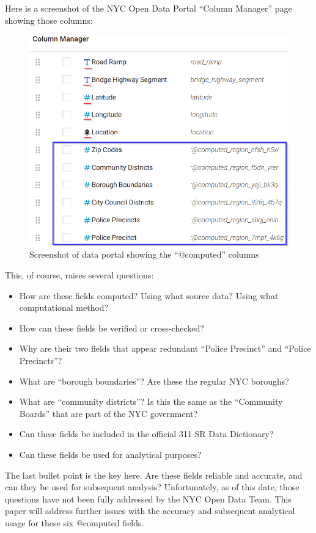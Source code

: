 \documentclass[12pt, titlepage]{article}
\begin{document}
Here is a screenshot of the NYC Open Data Portal ``Column Manager'' page showing those columns:

\begin{figure}[htbp]
  \centering
	  \includegraphics[scale = 0.7]{computed_columns_screenshot.png}
	  \caption{Screenshot of data portal showing the ``@computed'' columns}
	  \label{fig:computed-columns}
\end{figure}

This, of course, raises several questions:
\begin{itemize}
	\item How are these fields computed? Using what source data? Using what computational method?
	\item How can these fields be verified or cross-checked?
	\item Why are their two fields that appear redundant ``Police Precinct'' and ``Police Precincts''?
	\item What are ``borough boundaries''? Are these the regular NYC boroughs?
	\item What are ``community districts''? Is this the same as the ``Community Boards'' that are part of the NYC government?
	\item Can these fields be included in the official 311 SR Data Dictionary?
	\item Can these fields be used for analytical purposes? 
\end{itemize}	

The last bullet point is the key here. Are these fields reliable and accurate, and can they be used for subsequent analysis? Unfortunately,
as of this date, those questions have not been fully addressed by the  NYC Open Data Team. This paper will address further issues with the
accuracy and subsequent analytical usage for these six @computed fields.
	
\end{document}

